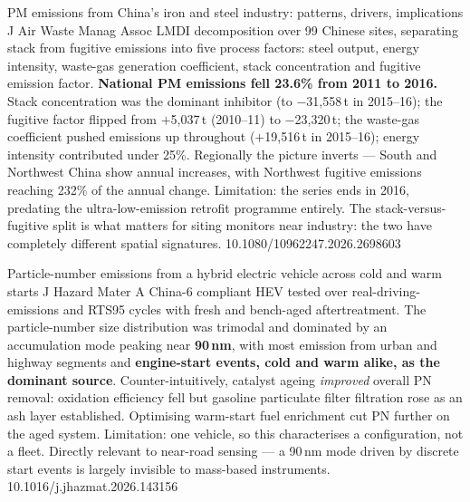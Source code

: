 \documentclass[10pt]{article}
\begin{document}

{PM emissions from China's iron and steel industry: patterns, drivers, implications}
{J Air Waste Manag Assoc}
{LMDI decomposition over 99 Chinese sites, separating stack from fugitive emissions into
five process factors: steel output, energy intensity, waste-gas generation coefficient,
stack concentration and fugitive emission factor. \textbf{National PM emissions fell
23.6\% from 2011 to 2016.} Stack concentration was the dominant inhibitor (to
$-$31{,}558\,t in 2015--16); the fugitive factor flipped from $+$5{,}037\,t (2010--11) to
$-$23{,}320\,t; the waste-gas coefficient pushed emissions up throughout
($+$19{,}516\,t in 2015--16); energy intensity contributed under 25\%. Regionally the
picture inverts --- South and Northwest China show annual increases, with Northwest
fugitive emissions reaching 232\% of the annual change. Limitation: the series ends in
2016, predating the ultra-low-emission retrofit programme entirely. The
stack-versus-fugitive split is what matters for siting monitors near industry: the two
have completely different spatial signatures.}
{10.1080/10962247.2026.2698603}

{Particle-number emissions from a hybrid electric vehicle across cold and warm starts}
{J Hazard Mater}
{A China-6 compliant HEV tested over real-driving-emissions and RTS95 cycles with fresh
and bench-aged aftertreatment. The particle-number size distribution was trimodal and
dominated by an accumulation mode peaking near \textbf{90\,nm}, with most emission from
urban and highway segments and \textbf{engine-start events, cold and warm alike, as the
dominant source}. Counter-intuitively, catalyst ageing \emph{improved} overall PN
removal: oxidation efficiency fell but gasoline particulate filter filtration rose as an
ash layer established. Optimising warm-start fuel enrichment cut PN further on the aged
system. Limitation: one vehicle, so this characterises a configuration, not a fleet.
Directly relevant to near-road sensing --- a 90\,nm mode driven by discrete start events
is largely invisible to mass-based instruments.}
{10.1016/j.jhazmat.2026.143156}

\clearpage

\end{document}
